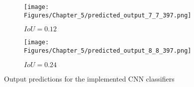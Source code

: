 \begin{figure} [h!]
\begin{subfigure}[b]{0.32\textwidth}
		\label{fig:GT_case_397}
	\end{subfigure}
	\hfill
	\begin{subfigure}[b]{0.32\textwidth}
		\centering
		\texttt{[image: Figures/Chapter\_5/predicted\_output\_7\_7\_397.png]}
		\caption{\(IoU=0.12\)}
		\label{fig:pred_7_7_case_397}
	\end{subfigure}
	\hfill
	\begin{subfigure}[b]{0.32\textwidth}
		\centering
		\texttt{[image: Figures/Chapter\_5/predicted\_output\_8\_8\_397.png]}
		\caption{\(IoU=0.24\)}
		\label{fig:pred_8_8_case_397}
	\end{subfigure}
	\caption{Output predictions for the implemented CNN classifiers}
	\label{fig:bounding_boxes_predictions}
\end{figure}
\clearpage

